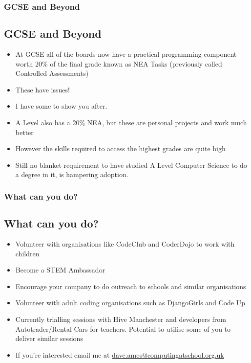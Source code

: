 \documentclass{beamer}
\begin{document}
\begin{frame}
\frametitle{GCSE and Beyond}
\subsection{GCSE and Beyond}
\begin{itemize}
  \item At GCSE all of the boards now have a practical programming component worth 20\% of the final grade known as NEA
    Tasks (previously called Controlled Assessments)
    
  \item These have issues!
    
  \item I have some to show you after.
    
  \item A Level also has a 20\% NEA, but these are personal projects and work much better
    
  \item However the skills required to access the highest grades are quite high
    
  \item Still no blanket requirement to have studied A Level Computer Science to do a degree in it, is hampering
    adoption.   
\end{itemize}

\end{frame}


\begin{frame}
\frametitle{What can you do?}
\subsection{What can you do?}
\begin{itemize}
\item Volunteer with organisations like CodeClub and CoderDojo to work with children
  
\item Become a STEM Ambassador
  
\item Encourage your company to do outreach to schools and similar organisations
  
\item Volunteer with adult coding organisations such as DjangoGirls and Code Up
  
\item Currently trialling sessions with Hive Manchester and developers from Autotrader/Rental Cars for
  teachers. Potential to utilise some of you to deliver similar sessions
\item If you're interested email me at \url{dave.ames@computingatschool.org.uk}
\end{itemize}

\end{frame}
\end{document}
